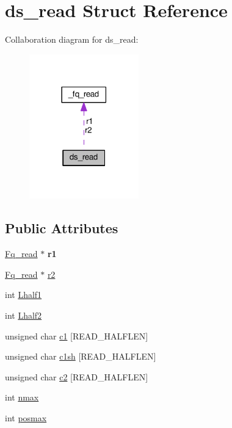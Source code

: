 \hypertarget{structds__read}{\section{ds\+\_\+read Struct Reference}
\label{structds__read}
}


Collaboration diagram for ds\+\_\+read\+:\nopagebreak
\begin{figure}[H]
\begin{center}
\leavevmode
\includegraphics[width=134pt]{structds__read__coll__graph}
\end{center}
\end{figure}
\subsection*{Public Attributes}
\begin{DoxyCompactItemize}
\item 
\hypertarget{structds__read_afc3da45c97f8de0efb2fd758ee403aa4}{\hyperlink{fq__read_8h_a9af37aa81397c9531c66863d4e97f034}{Fq\+\_\+read} $\ast$ {\bfseries r1}}\label{structds__read_afc3da45c97f8de0efb2fd758ee403aa4}

\item 
\hyperlink{fq__read_8h_a9af37aa81397c9531c66863d4e97f034}{Fq\+\_\+read} $\ast$ \hyperlink{structds__read_a9c3b84ac6a0349a9beff6c11f6ee5275}{r2}
\item 
int \hyperlink{structds__read_a93576491e7577cf93d7833314182b08b}{Lhalf1}
\item 
int \hyperlink{structds__read_ad6e4b185f2aa4bb5b020bad4d93cab92}{Lhalf2}
\item 
unsigned char \hyperlink{structds__read_a0dfe9d61d741a11022ac55594788f1e6}{c1} \mbox{[}R\+E\+A\+D\+\_\+\+H\+A\+L\+F\+L\+E\+N\mbox{]}
\item 
unsigned char \hyperlink{structds__read_a6e987171fc2d16d2c8de251cbf8e774f}{c1sh} \mbox{[}R\+E\+A\+D\+\_\+\+H\+A\+L\+F\+L\+E\+N\mbox{]}
\item 
unsigned char \hyperlink{structds__read_af26e72b90f742f48a920c32e53be3554}{c2} \mbox{[}R\+E\+A\+D\+\_\+\+H\+A\+L\+F\+L\+E\+N\mbox{]}
\item 
int \hyperlink{structds__read_ae4cb668ce0d39411b13ed2720743dbf7}{nmax}
\item 
int \hyperlink{structds__read_a62deaafbd72150dfc13c8f7dfa658914}{posmax}
\end{DoxyCompactItemize}


